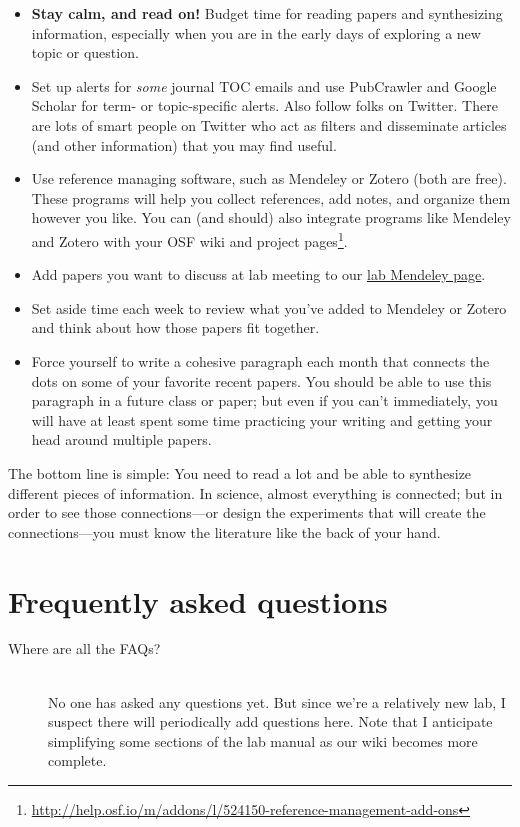 \documentclass[letterpaper,12pt,oneside]{memoir}
\begin{document}
{\begin{itemize}
\item \textbf{Stay calm, and read on!} Budget time for reading papers and synthesizing information, especially when you are in the early days of exploring a new topic or question. 
\item Set up alerts for \textit{some} journal TOC emails and use PubCrawler and Google Scholar for term- or topic-specific alerts. Also follow folks on Twitter. There are lots of smart people on Twitter who act as filters and disseminate articles (and other information) that you may find useful.
\item Use reference managing software, such as Mendeley or Zotero (both are free). These programs will help you collect references, add notes, and organize them however you like. You can (and should) also integrate programs like Mendeley and Zotero with your OSF wiki and project pages\footnote{\url{http://help.osf.io/m/addons/l/524150-reference-management-add-ons}}.
\item Add papers you want to discuss at lab meeting to our \href{https://www.mendeley.com/community/smith-lab-meetings/}{lab Mendeley page}. 
\item Set aside time each week to review what you've added to Mendeley or Zotero and think about how those papers fit together.
\item Force yourself to write a cohesive paragraph each month that connects the dots on some of your favorite recent papers. You should be able to use this paragraph in a future class or paper; but even if you can't immediately, you will have at least spent some time practicing your writing and getting your head around multiple papers.
\end{itemize}

\begin{shaded}
\noindent The bottom line is simple: You need to read a lot and be able to synthesize different pieces of information. In science, almost everything is connected; but in order to see those connections---or design the experiments that will create the connections---you must know the literature like the back of your hand.
\end{shaded}


\chapter{Frequently asked questions}

\begin{description}
\item[Where are all the FAQs?] \hfill \\
No one has asked any questions yet. But since we're a relatively new lab, I suspect there will periodically add questions here. Note that I anticipate simplifying some sections of the lab manual as our wiki becomes more complete.



\end{description}}
\end{document}
